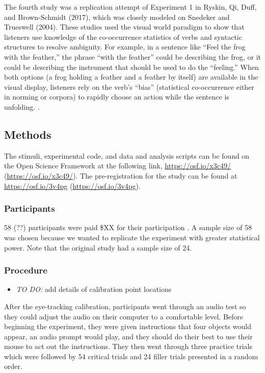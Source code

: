 \documentclass[
  man,floatsintext]{apa6}
\providecommand{\tightlist}{%
  \setlength{\itemsep}{0pt}\setlength{\parskip}{0pt}}
\begin{document}
The fourth study was a replication attempt of Experiment 1 in Ryskin, Qi, Duff, and Brown-Schmidt (2017), which was closely modeled on Snedeker and Trueswell (2004). These studies used the visual world paradigm to show that listeners use knowledge of the co-occurrence statistics of verbs and syntactic structures to resolve ambiguity. For example, in a sentence like ``Feel the frog with the feather,'' the phrase ``with the feather'' could be describing the frog, or it could be describing the instrument that should be used to do the ``feeling.'' When both options (a frog holding a feather and a feather by itself) are available in the visual display, listeners rely on the verb's ``bias'' (statistical co-occurrence either in norming or corpora) to rapidly choose an action while the sentence is unfolding.
.

\hypertarget{methods-3}{%
\subsection{Methods}\label{methods-3}}

The stimuli, experimental code, and data and analysis scripts can be found on the Open Science Framework at the following link, \url{https://osf.io/x3c49/} (\url{https://osf.io/x3c49/}). The pre-registration for the study can be found at \url{https://osf.io/3v4pg} (\url{https://osf.io/3v4pg}).

\hypertarget{participants-4}{%
\subsubsection{Participants}\label{participants-4}}

58 (??) participants were paid \$XX for their participation . A sample size of 58 was chosen because we wanted to replicate the experiment with greater statistical power. Note that the original study had a sample size of 24.

\hypertarget{procedure-3}{%
\subsubsection{Procedure}\label{procedure-3}}

\begin{itemize}
\tightlist
\item
  \emph{TO DO:} add details of calibration point locations
\end{itemize}

After the eye-tracking calibration, participants went through an audio test so they could adjust the audio on their computer to a comfortable level. Before beginning the experiment, they were given instructions that four objects would appear, an audio prompt would play, and they should do their best to use their mouse to act out the instructions. They then went through three practice trials which were followed by 54 critical trials and 24 filler trials presented in a random order.
\end{document}
